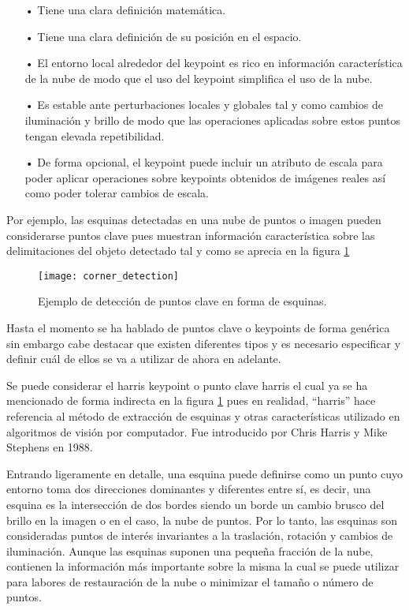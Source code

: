 \begin{itemize}
\item[•] Tiene una clara definición matemática.
\item[•] Tiene una clara definición de su posición en el espacio.
\item[•] El entorno local alrededor del keypoint es rico en información característica de la nube de modo que el uso del keypoint simplifica el uso de la nube.
\item[•] Es estable ante perturbaciones locales y globales tal y como cambios de iluminación y brillo de modo que las operaciones aplicadas sobre estos puntos tengan elevada repetibilidad.
\item[•] De forma opcional, el keypoint puede incluir un atributo de escala para poder aplicar operaciones sobre keypoints obtenidos de imágenes reales así como poder tolerar cambios de escala.
\end{itemize}


Por ejemplo, las esquinas detectadas en una nube de puntos o imagen pueden considerarse puntos clave pues muestran información característica sobre las delimitaciones del objeto detectado tal y como se aprecia en la figura \ref{fig:corner_detection}

\begin{figure}
\centering
\texttt{[image: corner\_detection]}
\caption{Ejemplo de detección de puntos clave en forma de esquinas.}\label{fig:corner_detection}
\end{figure}

Hasta el momento se ha hablado de puntos clave o keypoints de forma genérica sin embargo cabe destacar que existen diferentes tipos y es necesario especificar y definir cuál de ellos se va a utilizar de ahora en adelante.

Se puede considerar el harris keypoint o punto clave harris el cual ya se ha mencionado de forma indirecta en la figura \ref{fig:corner_detection} pues en realidad, ``harris'' hace referencia al método de extracción de esquinas y otras características utilizado en algoritmos de visión por computador. Fue introducido por Chris Harris y Mike Stephens en 1988.

Entrando ligeramente en detalle, una esquina puede definirse como un punto cuyo entorno toma dos direcciones dominantes y diferentes entre sí, es decir, una esquina es la intersección de dos bordes siendo un borde un cambio brusco del brillo en la imagen o en el caso, la nube de puntos. Por lo tanto, las esquinas son consideradas puntos de interés invariantes a la traslación, rotación y cambios de iluminación. 
Aunque las esquinas suponen una pequeña fracción de la nube, contienen la información más importante sobre la misma la cual se puede utilizar para labores de restauración de la nube o minimizar el tamaño o número de puntos.


